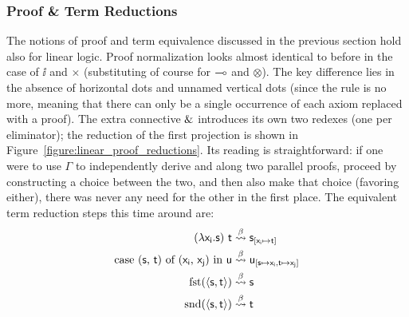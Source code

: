 \subsubsection{Proof \& Term Reductions}
The notions of proof and term equivalence discussed in the previous section hold also for linear logic.
Proof normalization looks almost identical to before in the case of $\ii$ and $\times$ (substituting of course for $\li$ and $\otimes$).
The key difference lies in the absence of horizontal dots and unnamed vertical dots (since the \Contraction{} rule is no more, meaning that there can only be a single occurrence of each axiom replaced with a proof).
The extra connective ${\&}$ introduces its own two redexes (one per eliminator); the reduction of the first projection is shown in Figure~\ref{figure:linear_proof_reductions}. 
Its reading is straightforward: if one were to use $\Gamma$ to independently derive  and  along two parallel proofs, proceed by constructing a choice between the two, and then also make that choice (favoring either), there was never any need for the other in the first place.
The equivalent term reduction steps this time around are:
\begin{align*}
(\mathsf{\lambda x_i.s})~\mathsf{t} & \overset{\beta}{\leadsto} \mathsf{s}_{[\mathsf{x_i} \mapsto \mathsf{t}]}\\
\textrm{case (\ensuremath{\mathsf{s}}, \ensuremath{\mathsf{t}}) of (\ensuremath{\mathsf{x_i}}, \ensuremath{\mathsf{x_j}}) in \ensuremath{\mathsf{u}}} & \overset{\beta}{\leadsto} \mathsf{u_{[\mathsf{s} \mapsto \mathsf{x_i}, \mathsf{t} \mapsto \mathsf{x_j}]}}\\
\textrm{fst}(\langle\mathsf{s},\mathsf{t}\rangle) & \overset{\beta}{\leadsto} \mathsf{s}\\
\textrm{snd}(\langle\mathsf{s},\mathsf{t}\rangle) & \overset{\beta}{\leadsto} \mathsf{t}\\
\end{align*}


